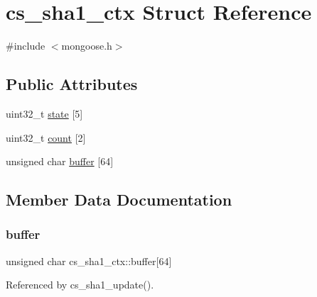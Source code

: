 \hypertarget{structcs__sha1__ctx}{}\section{cs\+\_\+sha1\+\_\+ctx Struct Reference}
\label{structcs__sha1__ctx}


{\ttfamily \#include $<$mongoose.\+h$>$}

\subsection*{Public Attributes}
\begin{DoxyCompactItemize}
\item 
uint32\+\_\+t \hyperlink{structcs__sha1__ctx_aaec67b16b157c16a771df82ec41220b0_aaec67b16b157c16a771df82ec41220b0}{state} \mbox{[}5\mbox{]}
\item 
uint32\+\_\+t \hyperlink{structcs__sha1__ctx_af6258c6cb812c334f1a287e2d6b9ea09_af6258c6cb812c334f1a287e2d6b9ea09}{count} \mbox{[}2\mbox{]}
\item 
unsigned char \hyperlink{structcs__sha1__ctx_ac7c9295501f0e13de5b0db4305a2719b_ac7c9295501f0e13de5b0db4305a2719b}{buffer} \mbox{[}64\mbox{]}
\end{DoxyCompactItemize}


\subsection{Member Data Documentation}
\mbox{\label{structcs__sha1__ctx_ac7c9295501f0e13de5b0db4305a2719b_ac7c9295501f0e13de5b0db4305a2719b}} 
\subsubsection{\texorpdfstring{buffer}{buffer}}
{\footnotesize\ttfamily unsigned char cs\+\_\+sha1\+\_\+ctx\+::buffer\mbox{[}64\mbox{]}}



Referenced by cs\+\_\+sha1\+\_\+update().

\mbox{\label{structcs__sha1__ctx_af6258c6cb812c334f1a287e2d6b9ea09_af6258c6cb812c334f1a287e2d6b9ea09}} 
